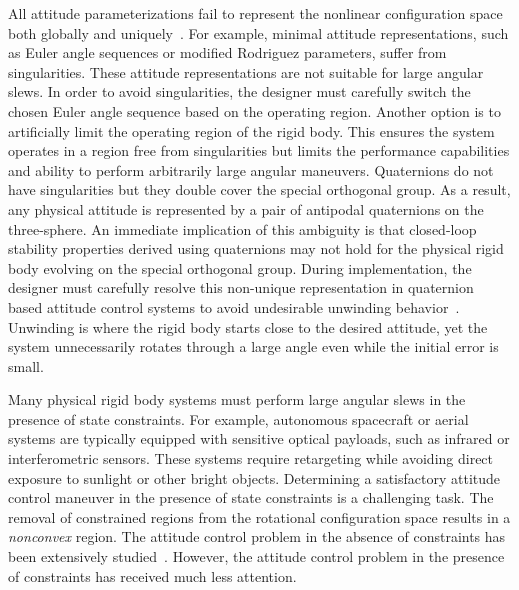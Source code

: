 \documentclass[letterpaper, 10 pt, conference]{ieeeconf}  %
\begin{document}
All attitude parameterizations fail to represent the nonlinear configuration space both globally and uniquely~\cite{chaturvedi2011a}.
For example, minimal attitude representations, such as Euler angle sequences or modified Rodriguez parameters, suffer from singularities.
These attitude representations are not suitable for large angular slews.
In order to avoid singularities, the designer must carefully switch the chosen Euler angle sequence based on the operating region.
Another option is to artificially limit the operating region of the rigid body.
This ensures the system operates in a region free from singularities but limits the performance capabilities and ability to perform arbitrarily large angular maneuvers.
Quaternions do not have singularities but they double cover the special orthogonal group.
As a result, any physical attitude is represented by a pair of antipodal quaternions on the three-sphere.
An immediate implication of this ambiguity is that closed-loop stability properties derived using quaternions may not hold for the physical rigid body evolving on the special orthogonal group.
During implementation, the designer must carefully resolve this non-unique representation in quaternion based attitude control systems to avoid undesirable unwinding behavior~\cite{bhat2000}.
Unwinding is where the rigid body starts close to the desired attitude, yet the system unnecessarily rotates through a large angle even while the initial error is small.

Many physical rigid body systems must perform large angular slews in the presence of state constraints.
For example, autonomous spacecraft or aerial systems are typically equipped with sensitive optical payloads, such as infrared or interferometric sensors.
These systems require retargeting while avoiding direct exposure to sunlight or other bright objects.
Determining a satisfactory attitude control maneuver in the presence of state constraints is a challenging task.
The removal of constrained regions from the rotational configuration space results in a \textit{nonconvex} region.
The attitude control problem in the absence of constraints has been extensively studied~\cite{sanyal2008,lee2010,lee2011a}.
However, the attitude control problem in the presence of constraints has received much less attention.
\end{document}
